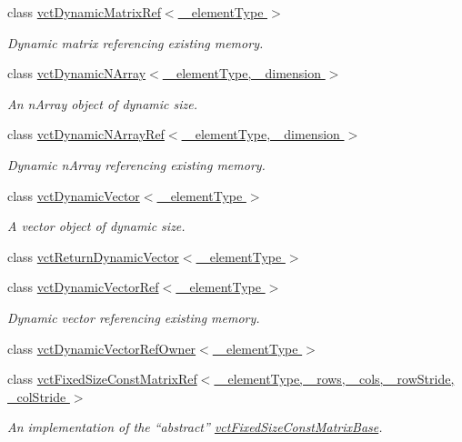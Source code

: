 \begin{DoxyCompactItemize}
class \hyperlink{classvct_dynamic_matrix_ref}{vct\-Dynamic\-Matrix\-Ref$<$ \-\_\-element\-Type $>$}
\begin{DoxyCompactList}\small\item\em Dynamic matrix referencing existing memory. \end{DoxyCompactList}\item 
class \hyperlink{classvct_dynamic_n_array}{vct\-Dynamic\-N\-Array$<$ \-\_\-element\-Type, \-\_\-dimension $>$}
\begin{DoxyCompactList}\small\item\em An n\-Array object of dynamic size. \end{DoxyCompactList}\item 
class \hyperlink{classvct_dynamic_n_array_ref}{vct\-Dynamic\-N\-Array\-Ref$<$ \-\_\-element\-Type, \-\_\-dimension $>$}
\begin{DoxyCompactList}\small\item\em Dynamic n\-Array referencing existing memory. \end{DoxyCompactList}\item 
class \hyperlink{classvct_dynamic_vector}{vct\-Dynamic\-Vector$<$ \-\_\-element\-Type $>$}
\begin{DoxyCompactList}\small\item\em A vector object of dynamic size. \end{DoxyCompactList}\item 
class \hyperlink{classvct_return_dynamic_vector}{vct\-Return\-Dynamic\-Vector$<$ \-\_\-element\-Type $>$}
\item 
class \hyperlink{classvct_dynamic_vector_ref}{vct\-Dynamic\-Vector\-Ref$<$ \-\_\-element\-Type $>$}
\begin{DoxyCompactList}\small\item\em Dynamic vector referencing existing memory. \end{DoxyCompactList}\item 
class \hyperlink{classvct_dynamic_vector_ref_owner}{vct\-Dynamic\-Vector\-Ref\-Owner$<$ \-\_\-element\-Type $>$}
\item 
class \hyperlink{classvct_fixed_size_const_matrix_ref}{vct\-Fixed\-Size\-Const\-Matrix\-Ref$<$ \-\_\-element\-Type, \-\_\-rows, \-\_\-cols, \-\_\-row\-Stride, \-\_\-col\-Stride $>$}
\begin{DoxyCompactList}\small\item\em An implementation of the ``abstract'' \hyperlink{classvct_fixed_size_const_matrix_base}{vct\-Fixed\-Size\-Const\-Matrix\-Base}. \end{DoxyCompactList}\item 

\end{DoxyCompactItemize}
